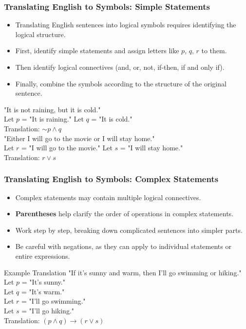 \documentclass{beamer}
\begin{document}
        \begin{frame}
        \frametitle{Translating English to Symbols: Simple Statements}
        \begin{itemize}
            \item Translating English sentences into logical symbols requires identifying the logical structure.
            \item First, identify simple statements and assign letters like $p$, $q$, $r$ to them.
            \item Then identify logical connectives (and, or, not, if-then, if and only if).
            \item Finally, combine the symbols according to the structure of the original sentence.
        \end{itemize}
        
        \begin{example}
        "It is not raining, but it is cold."\\
        Let $p$ = "It is raining." Let $q$ = "It is cold."\\
        Translation: $\sim p \wedge q$\\[0.3cm]
        "Either I will go to the movie or I will stay home."\\
        Let $r$ = "I will go to the movie." Let $s$ = "I will stay home."\\
        Translation: $r \vee s$
        \end{example}
        \end{frame}
        
        \begin{frame}
        \frametitle{Translating English to Symbols: Complex Statements}
        \begin{itemize}
            \item Complex statements may contain multiple logical connectives.
            \item \textbf{Parentheses} help clarify the order of operations in complex statements.
            \item Work step by step, breaking down complicated sentences into simpler parts.
            \item Be careful with negations, as they can apply to individual statements or entire expressions.
        \end{itemize}
        
        \begin{block}{Example Translation}
        "If it's sunny and warm, then I'll go swimming or hiking."\\[0.2cm]
        Let $p$ = "It's sunny."\\
        Let $q$ = "It's warm."\\
        Let $r$ = "I'll go swimming."\\
        Let $s$ = "I'll go hiking."\\[0.2cm]
        Translation: $(p \wedge q) \rightarrow (r \vee s)$
        \end{block}

        \end{frame}
\end{document}
